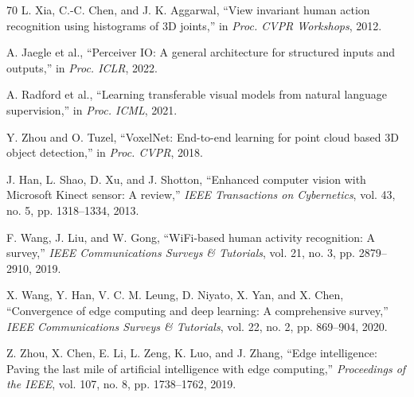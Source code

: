 \documentclass[journal]{IEEEtran}
\begin{document}
\begin{thebibliography}{70}
L. Xia, C.-C. Chen, and J. K. Aggarwal, ``View invariant human action recognition using histograms of 3D joints,'' in \emph{Proc. CVPR Workshops}, 2012.

A. Jaegle et al., ``Perceiver IO: A general architecture for structured inputs and outputs,'' in \emph{Proc. ICLR}, 2022.

A. Radford et al., ``Learning transferable visual models from natural language supervision,'' in \emph{Proc. ICML}, 2021.

Y. Zhou and O. Tuzel, ``VoxelNet: End-to-end learning for point cloud based 3D object detection,'' in \emph{Proc. CVPR}, 2018.

J. Han, L. Shao, D. Xu, and J. Shotton, ``Enhanced computer vision with Microsoft Kinect sensor: A review,'' \emph{IEEE Transactions on Cybernetics}, vol. 43, no. 5, pp. 1318--1334, 2013.

F. Wang, J. Liu, and W. Gong, ``WiFi-based human activity recognition: A survey,'' \emph{IEEE Communications Surveys \& Tutorials}, vol. 21, no. 3, pp. 2879--2910, 2019.

X. Wang, Y. Han, V. C. M. Leung, D. Niyato, X. Yan, and X. Chen, ``Convergence of edge computing and deep learning: A comprehensive survey,'' \emph{IEEE Communications Surveys \& Tutorials}, vol. 22, no. 2, pp. 869--904, 2020.

Z. Zhou, X. Chen, E. Li, L. Zeng, K. Luo, and J. Zhang, ``Edge intelligence: Paving the last mile of artificial intelligence with edge computing,'' \emph{Proceedings of the IEEE}, vol. 107, no. 8, pp. 1738--1762, 2019.

\end{thebibliography}
\end{document}
